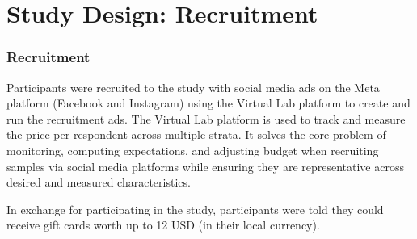 \documentclass[aspectratio=169]{beamer}
\begin{document}
\section{Study Design: Recruitment}

\begin{frame}
  \frametitle{Recruitment}

Participants were recruited to the study with social media ads on the Meta platform (Facebook and Instagram) using the Virtual Lab platform to create and run the recruitment ads. The Virtual Lab platform is used to track and measure the price-per-respondent across multiple strata. It solves the core problem of monitoring, computing expectations, and adjusting budget when recruiting samples via social media platforms while ensuring they are representative across desired and measured characteristics.  

In exchange for participating in the study, participants were told they could receive gift cards worth up to 12 USD (in their local currency).

\end{frame}
\end{document}
